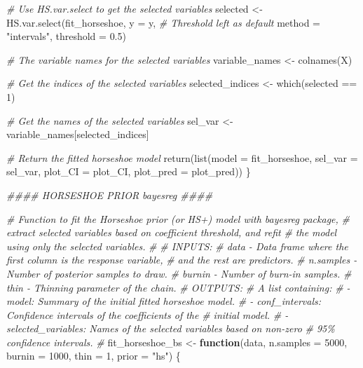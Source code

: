 \documentclass[
  11pt,
]{article}
\newenvironment{Shaded}{}{}
\newcommand{\AttributeTok}[1]{\textcolor[rgb]{0.49,0.56,0.16}{#1}}
\newcommand{\CommentTok}[1]{\textcolor[rgb]{0.38,0.63,0.69}{\textit{#1}}}
\newcommand{\ControlFlowTok}[1]{\textcolor[rgb]{0.00,0.44,0.13}{\textbf{#1}}}
\newcommand{\DecValTok}[1]{\textcolor[rgb]{0.25,0.63,0.44}{#1}}
\newcommand{\DocumentationTok}[1]{\textcolor[rgb]{0.73,0.13,0.13}{\textit{#1}}}
\newcommand{\FloatTok}[1]{\textcolor[rgb]{0.25,0.63,0.44}{#1}}
\newcommand{\FunctionTok}[1]{\textcolor[rgb]{0.02,0.16,0.49}{#1}}
\newcommand{\NormalTok}[1]{#1}
\newcommand{\OtherTok}[1]{\textcolor[rgb]{0.00,0.44,0.13}{#1}}
\newcommand{\SpecialCharTok}[1]{\textcolor[rgb]{0.25,0.44,0.63}{#1}}
\newcommand{\StringTok}[1]{\textcolor[rgb]{0.25,0.44,0.63}{#1}}
\begin{document}
\begin{Shaded}
\begin{Highlighting}[]
  \CommentTok{\# Use HS.var.select to get the selected variables}
\NormalTok{  selected }\OtherTok{\textless{}{-}} \FunctionTok{HS.var.select}\NormalTok{(fit\_horseshoe, }\AttributeTok{y =}\NormalTok{ y, }
                            \CommentTok{\# Threshold left as default}
                            \AttributeTok{method =} \StringTok{"intervals"}\NormalTok{, }\AttributeTok{threshold =} \FloatTok{0.5}\NormalTok{)}
  
  \CommentTok{\# The variable names for the selected variables}
\NormalTok{  variable\_names }\OtherTok{\textless{}{-}} \FunctionTok{colnames}\NormalTok{(X)}
  
  \CommentTok{\# Get the indices of the selected variables}
\NormalTok{  selected\_indices }\OtherTok{\textless{}{-}} \FunctionTok{which}\NormalTok{(selected }\SpecialCharTok{==} \DecValTok{1}\NormalTok{)}
  
  \CommentTok{\# Get the names of the selected variables}
\NormalTok{  sel\_var }\OtherTok{\textless{}{-}}\NormalTok{ variable\_names[selected\_indices]}
  
  \CommentTok{\# Return the fitted horseshoe model}
  \FunctionTok{return}\NormalTok{(}\FunctionTok{list}\NormalTok{(}\AttributeTok{model =}\NormalTok{ fit\_horseshoe, }\AttributeTok{sel\_var =}\NormalTok{ sel\_var, }\AttributeTok{plot\_CI =}\NormalTok{ plot\_CI, }
              \AttributeTok{plot\_pred =}\NormalTok{ plot\_pred))}
\NormalTok{\}}

\DocumentationTok{\#\#\#\# HORSESHOE PRIOR \textquotesingle{}bayesreg\textquotesingle{} \#\#\#\#}

\CommentTok{\# Function to fit the Horseshoe prior (or HS+) model with bayesreg package, }
\CommentTok{\#   extract selected variables based on coefficient threshold, and refit }
\CommentTok{\#   the model using only the selected variables.}
\CommentTok{\#}
\CommentTok{\# INPUTS:}
\CommentTok{\#     data {-} Data frame where the first column is the response variable, }
\CommentTok{\#            and the rest are predictors.}
\CommentTok{\#     n.samples {-} Number of posterior samples to draw.}
\CommentTok{\#     burnin {-} Number of burn{-}in samples.}
\CommentTok{\#     thin {-} Thinning parameter of the chain.}
\CommentTok{\# OUTPUTS:}
\CommentTok{\#     A list containing:}
\CommentTok{\#       {-} model: Summary of the initial fitted horseshoe model.}
\CommentTok{\#       {-} conf\_intervals: Confidence intervals of the coefficients of the }
\CommentTok{\#                         initial model.}
\CommentTok{\#       {-} selected\_variables: Names of the selected variables based on non{-}zero }
\CommentTok{\#                             95\% confidence intervals.}
\CommentTok{\#}
\NormalTok{fit\_horseshoe\_bs }\OtherTok{\textless{}{-}} \ControlFlowTok{function}\NormalTok{(data, }\AttributeTok{n.samples =} \DecValTok{5000}\NormalTok{, }\AttributeTok{burnin =} \DecValTok{1000}\NormalTok{, }
                             \AttributeTok{thin =} \DecValTok{1}\NormalTok{, }\AttributeTok{prior =} \StringTok{"hs"}\NormalTok{) \{}
  

\end{Highlighting}
\end{Shaded}
\end{document}
